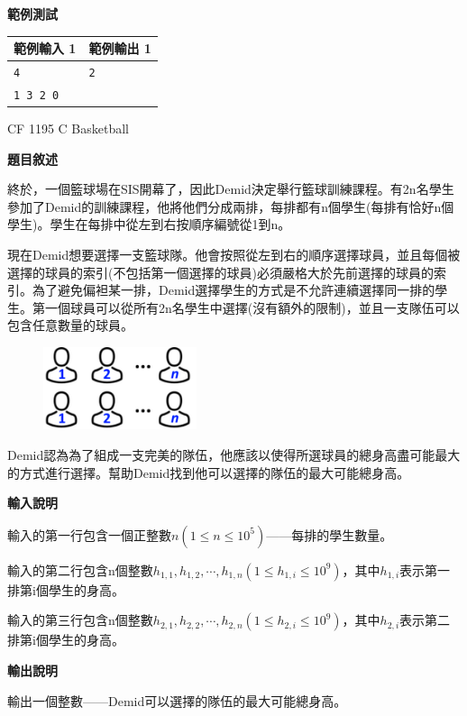     \textbf{範例測試}

    \begin{tabular}{|m{7cm}|m{7cm}|}
        \hline
        範例輸入 1 & 範例輸出 1 \\
        \hline
        \verb|4| & \verb|2| \\
        \verb|1 3 2 0| & \\
        \hline
    \end{tabular}

    \problem CF 1195 C Basketball

    \textbf{題目敘述}

    終於，一個籃球場在SIS開幕了，因此Demid決定舉行籃球訓練課程。有2n名學生參加了Demid的訓練課程，他將他們分成兩排，每排都有n個學生(每排有恰好n個學生)。學生在每排中從左到右按順序編號從1到n。

    現在Demid想要選擇一支籃球隊。他會按照從左到右的順序選擇球員，並且每個被選擇的球員的索引(不包括第一個選擇的球員)必須嚴格大於先前選擇的球員的索引。為了避免偏袒某一排，Demid選擇學生的方式是不允許連續選擇同一排的學生。第一個球員可以從所有2n名學生中選擇(沒有額外的限制)，並且一支隊伍可以包含任意數量的球員。

    \begin{figure}[!htbp]
        \centering
        \includegraphics[width=0.4\textwidth]{../Images/CF1195.png}
    \end{figure}

    Demid認為為了組成一支完美的隊伍，他應該以使得所選球員的總身高盡可能最大的方式進行選擇。幫助Demid找到他可以選擇的隊伍的最大可能總身高。

    \textbf{輸入說明}

    輸入的第一行包含一個正整數$n(1 \le n \le 10^5)$——每排的學生數量。

    輸入的第二行包含n個整數$h_{1,1}, h_{1,2}, \cdots, h_{1,n}(1 \le h_{1,i} \le 10^9)$，其中$h_{1,i}$表示第一排第i個學生的身高。

    輸入的第三行包含n個整數$h_{2,1}, h_{2,2}, \cdots, h_{2,n}(1 \le h_{2,i} \le 10^9)$，其中$h_{2,i}$表示第二排第i個學生的身高。

    \textbf{輸出說明}

    輸出一個整數——Demid可以選擇的隊伍的最大可能總身高。


